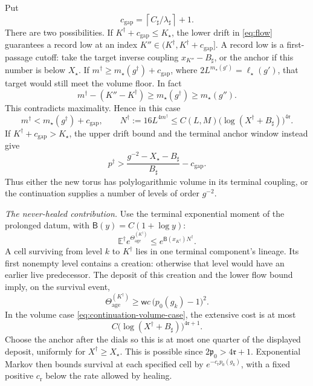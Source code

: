 \documentclass[11pt,letterpaper,reqno]{amsart}
\theoremstyle{definition}
\theoremstyle{remark}
\begin{document}
Put
\[
 c_{\mathrm{gap}}=
       \left\lceil C_\sharp/\lambda_\sharp\right\rceil+1.
\]
There are two possibilities. If
\(K^\dagger+c_{\mathrm{gap}}\le K_\star\), the lower drift
in \eqref{eq:flow} guarantees a record low at an index
\(K''\in(K^\dagger,K^\dagger+c_{\mathrm{gap}}]\).
A record low is a first-passage cutoff: take the target
inverse coupling \(x_{K''}-B_\sharp\), or the anchor if this
number is below \(X_\star\). If
\(m^\dagger\ge m_\star(g^\dagger)+c_{\mathrm{gap}}\),
where \(2L^{m_\star(g')}=\ell_\star(g')\), that target
would still meet the volume floor. In fact
\[
 m^\dagger-(K''-K^\dagger)
       \ge m_\star(g^\dagger)\ge m_\star(g'').
\]
This contradicts maximality. Hence in this case
\begin{equation}\label{eq:continuation-volume-case}
 m^\dagger<m_\star(g^\dagger)+c_{\mathrm{gap}},\qquad
 N^\dagger:=16L^{4m^\dagger}
       \le C(L,M)\bigl(\log(X^\dagger+B_\sharp)\bigr)^{4\mathfrak r}.
\end{equation}
If \(K^\dagger+c_{\mathrm{gap}}>K_\star\), the upper
drift bound and the terminal anchor window instead give
\begin{equation}\label{eq:continuation-coupling-case}
 p^\dagger>
       \frac{g^{-2}-X_\star-B_\sharp}{B_\sharp}
                         -c_{\mathrm{gap}}.
\end{equation}
Thus either the new torus has polylogarithmic volume in its
terminal coupling, or the continuation supplies a number
of levels of order \(g^{-2}\).

\emph{The never-healed contribution.}
Use the terminal exponential moment of the prolonged datum,
with
\(\mathsf B(y)=C(1+\log y)\):
\[
 \mathbb E^\dagger e^{\Theta_{\mathrm{age}}^{(K^\dagger)}}
       \le e^{\mathsf B(x_{K^\dagger})N^\dagger}.
\]
A cell surviving from level \(k\) to \(K^\dagger\) lies
in one terminal component's lineage. Its first nonempty
level contains a creation: otherwise that level would have
an earlier live predecessor. The deposit of this creation
and the lower flow bound imply, on the survival event,
\[
 \Theta_{\mathrm{age}}^{(K^\dagger)}
       \ge\mathsf w c\,\bigl(p_0(g_k)-1\bigr)^2.
\]
In the volume case \eqref{eq:continuation-volume-case},
the extensive cost is at most
\[
 C\bigl(\log(X^\dagger+B_\sharp)\bigr)^{4\mathfrak r+1}.
\]
Choose the anchor after the dials so this is at most one
quarter of the displayed deposit, uniformly for
\(X^\dagger\ge X_\star\). This is possible since
\(2\mathfrak p_0>4\mathfrak r+1\). Exponential Markov
then bounds survival at each specified cell by
\(e^{-c_{\mathrm r}p_0(g_k)}\), with a fixed positive
\(c_{\mathrm r}\) below the rate allowed by healing.
\end{document}
